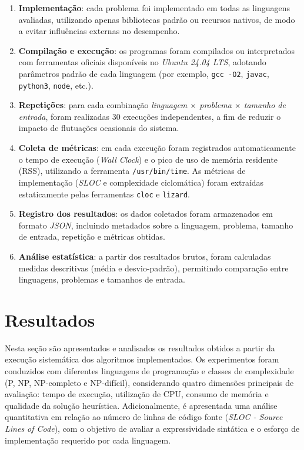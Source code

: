 \documentclass[12pt,a4paper]{article}
\newcommand{\eng}[1]{\textit{#1}}
\begin{document}
\begin{enumerate}
  \item \textbf{Implementação}: cada problema foi implementado em todas as linguagens avaliadas, utilizando apenas bibliotecas padrão ou recursos nativos, de modo a evitar influências externas no desempenho.

  \item \textbf{Compilação e execução}: os programas foram compilados ou interpretados com ferramentas oficiais disponíveis no \eng{Ubuntu 24.04 LTS}, adotando parâmetros padrão de cada linguagem (por exemplo, \texttt{gcc -O2}, \texttt{javac}, \texttt{python3}, \texttt{node}, etc.).

  \item \textbf{Repetições}: para cada combinação \eng{linguagem $\times$ problema $\times$ tamanho de entrada}, foram realizadas 30 execuções independentes, a fim de reduzir o impacto de flutuações ocasionais do sistema.

  \item \textbf{Coleta de métricas}: em cada execução foram registrados automaticamente o tempo de execução (\eng{Wall Clock}) e o pico de uso de memória residente (RSS), utilizando a ferramenta \texttt{/usr/bin/time}. As métricas de implementação (\eng{SLOC} e complexidade ciclomática) foram extraídas estaticamente pelas ferramentas \texttt{cloc} e \texttt{lizard}.

  \item \textbf{Registro dos resultados}: os dados coletados foram armazenados em formato \eng{JSON}, incluindo metadados sobre a linguagem, problema, tamanho de entrada, repetição e métricas obtidas.

  \item \textbf{Análise estatística}: a partir dos resultados brutos, foram calculadas medidas descritivas (média e desvio-padrão), permitindo comparação entre linguagens, problemas e tamanhos de entrada.
\end{enumerate}

\section{Resultados}

Nesta seção são apresentados e analisados os resultados obtidos a partir da execução sistemática dos algoritmos implementados. Os experimentos foram conduzidos com diferentes linguagens de programação e classes de complexidade (P, NP, NP-completo e NP-difícil), considerando quatro dimensões principais de avaliação: tempo de execução, utilização de CPU, consumo de memória e qualidade da solução heurística. Adicionalmente, é apresentada uma análise quantitativa em relação ao número de linhas de código fonte (\eng{SLOC - Source Lines of Code}), com o objetivo de avaliar a expressividade sintática e o esforço de implementação requerido por cada linguagem.
\end{document}
